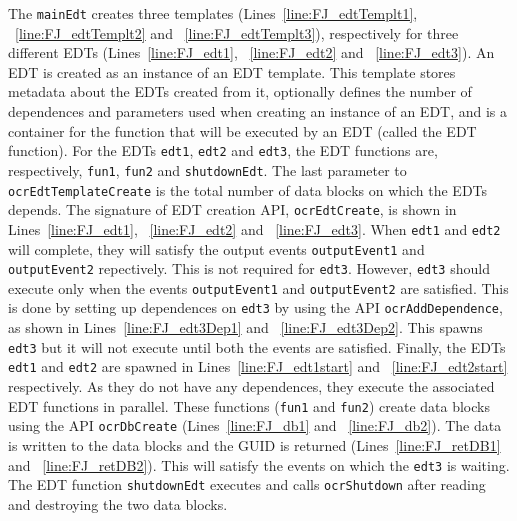 The \texttt{mainEdt} creates three templates (Lines~\ref{line:FJ_edtTemplt1}, ~\ref{line:FJ_edtTemplt2}
and ~\ref{line:FJ_edtTemplt3}), respectively for three different EDTs
(Lines~\ref{line:FJ_edt1}, ~\ref{line:FJ_edt2} and ~\ref{line:FJ_edt3}).
An EDT is created as an instance of an EDT template.
This template stores metadata about the EDTs created from it,
optionally defines the number of dependences and parameters used when
creating an instance of an EDT, and is a container for the function
that will be executed by an EDT (called the EDT function).
For the EDTs \texttt{edt1}, \texttt{edt2} and \texttt{edt3}, the EDT functions
are, respectively, \texttt{fun1}, \texttt{fun2} and \texttt{shutdownEdt}.
The last parameter to \texttt{ocrEdtTemplateCreate} is the total number of
data blocks on which the EDTs depends. The signature of EDT creation API,
\texttt{ocrEdtCreate}, is shown in Lines~\ref{line:FJ_edt1}, ~\ref{line:FJ_edt2}
and ~\ref{line:FJ_edt3}. When \texttt{edt1} and \texttt{edt2} will complete,
they will satisfy the output events \texttt{outputEvent1} and \texttt{outputEvent2} repectively.
This is not required for \texttt{edt3}. However, \texttt{edt3} should execute only
when the events \texttt{outputEvent1} and \texttt{outputEvent2} are satisfied.
This is done by setting up dependences on \texttt{edt3} by using the API \texttt{ocrAddDependence},
as shown in Lines~\ref{line:FJ_edt3Dep1} and ~\ref{line:FJ_edt3Dep2}.
This spawns \texttt{edt3} but it will not execute until both the events
are satisfied. Finally, the EDTs \texttt{edt1} and \texttt{edt2} are
spawned in Lines~\ref{line:FJ_edt1start} and ~\ref{line:FJ_edt2start} respectively.
As they do not have any dependences, they execute the associated EDT functions
in parallel. These functions (\texttt{fun1} and \texttt{fun2}) create
data blocks using the API \texttt{ocrDbCreate} (Lines~\ref{line:FJ_db1} and ~\ref{line:FJ_db2}).
The data is written to the data blocks and the GUID is returned (Lines~\ref{line:FJ_retDB1}
and ~\ref{line:FJ_retDB2}). This will satisfy the events on which the \texttt{edt3}
is waiting. The EDT function \texttt{shutdownEdt} executes
and calls \texttt{ocrShutdown} after reading and destroying the two data blocks.

